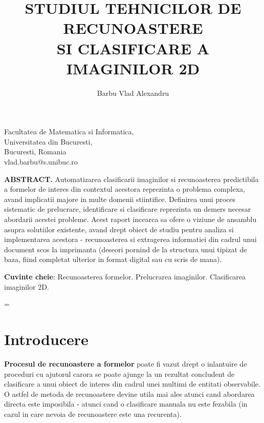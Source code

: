 \documentclass[10pt]{article}
\title{\renewcommand{\baselinestretch}{1.17}\normalsize\bf%
\uppercase{
	Studiul tehnicilor de recunoastere \\
	si clasificare a imaginilor 2D}
}
\author{
Barbu Vlad Alexandru
}
\begin{document}
\date{}

\maketitle

\vspace{-0.5cm}

\begin{center}
{\footnotesize 
Facultatea de Matematica si Informatica, \\
Universitatea din Bucuresti, \\
Bucuresti, Romania \\
vlad.barbu@s.unibuc.ro \\
}
\end{center}

\bigskip
\noindent
{\small{\bf ABSTRACT.}
		Automatizarea clasificarii imaginilor si recunoasterea predictibila 
	a formelor de interes din contextul acestora reprezinta o problema complexa,
	avand implicatii majore in multe domenii stiintifice. Definirea unui
	proces sistematic de prelucrare, identificare si clasificare reprezinta
	un demers necesar abordarii acestei probleme. Acest raport incearca sa
	ofere o viziune de ansamblu asupra solutiilor existente, 
	avand drept obiect de studiu pentru analiza si implementarea acestora - recunoasterea 
	si extragerea informatiei din cadrul unui document scos la imprimanta (deseori pornind
	de la structura unui tipizat de baza, fiind completat ulterior in format digital
	sau cu scris de mana).
}

\medskip
\noindent
{\small{\bf Cuvinte cheie}{:} Recunoasterea formelor. Prelucrarea imaginilor. Clasificarea imaginilor 2D.
}

\baselineskip=\normalbaselineskip

\section{Introducere}\label{sec:1}

\> {\bf Procesul de recunoastere a formelor} poate fi vazut drept o inlantuire de proceduri cu ajutorul
carora se poate ajunge la un rezultat concludent de clasificare a unui obiect de
interes din cadrul unei multimi de entitati observabile. O astfel de metoda de recunoastere
devine utila mai ales atunci cand abordarea directa este imposibila - atunci cand o 
clasificare manuala nu este fezabila (in cazul in care nevoia de recunoastere este una recurenta).
\end{document}
